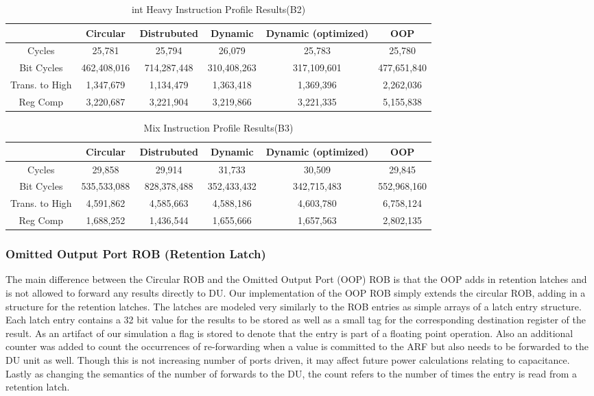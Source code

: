 \begin{table*}[!tb]
\centering
\caption{int Heavy Instruction Profile Results(B2)}
\begin{tabular}{|c|c|c|c|c|c|} \hline
    & Circular  & Distrubuted & Dynamic & Dynamic (optimized) & OOP\\ \hline
Cycles&25,781&	25,794&	26,079	&25,783	&25,780\\ \hline
Bit Cycles&462,408,016	&714,287,448	&310,408,263	&317,109,601	&477,651,840\\ \hline
Trans. to High&1,347,679&	1,134,479	&1,363,418&	1,369,396	&2,262,036\\ \hline
Reg Comp&3,220,687	&3,221,904	&3,219,866	&3,221,335&	5,155,838\\ \hline
\end{tabular}
\label{tab:bench2}
\end{table*}

\begin{table*}[!tb]
\centering
\caption{Mix Instruction Profile Results(B3)}
\begin{tabular}{|c|c|c|c|c|c|} \hline
    & Circular  & Distrubuted & Dynamic & Dynamic (optimized) & OOP\\ \hline
Cycles&29,858	&29,914	&31,733	&30,509	&29,845\\ \hline

Bit Cycles&535,533,088&	828,378,488&	352,433,432	&342,715,483	&552,968,160\\ \hline

Trans. to High&4,591,862	&4,585,663	&4,588,186&	4,603,780&	6,758,124\\ \hline

Reg Comp&1,688,252&	1,436,544	&1,655,666	&1,657,563	&2,802,135\\ \hline
\end{tabular}
\label{tab:bench3}
\end{table*}


\subsubsection{Omitted Output Port ROB (Retention Latch)}
The main difference between the Circular ROB and the Omitted Output Port (OOP) ROB is that the OOP adds in retention latches and is not allowed to forward any results directly to DU.  Our implementation of the OOP ROB simply extends the circular ROB, adding in a structure for the retention latches.  The latches are modeled very similarly to the ROB entries as simple arrays
of a latch entry structure.  Each latch entry contains a 32 bit value for the results to be stored as well as a small tag for the corresponding destination register of the result.  As an artifact of our simulation a flag is stored to denote that the entry is part of a floating point operation.  Also an additional counter was added to count the occurrences of re-forwarding when a value is committed to the ARF but also needs to be forwarded to the DU unit as well.  Though this is not increasing number of ports driven, it may affect future power calculations relating to capacitance.  Lastly as changing the semantics of the number of forwards to the DU, the count refers to the number of times the entry is read from a retention latch.

